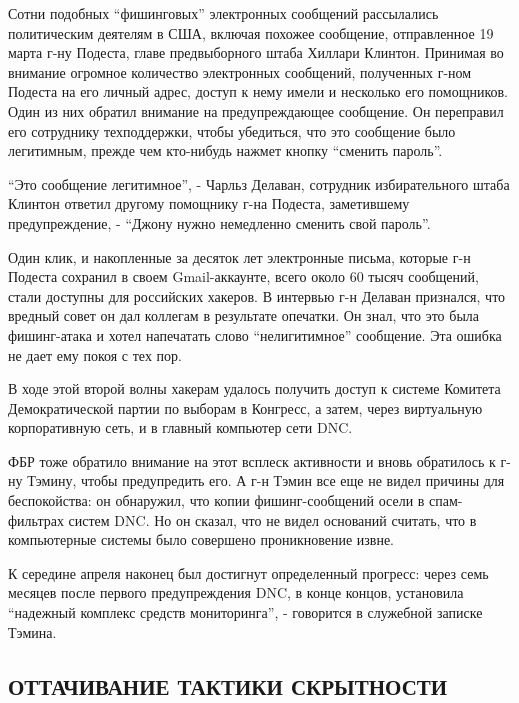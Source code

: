 Сотни подобных ``фишинговых'' электронных сообщений рассылались
политическим деятелям в США, включая похожее сообщение, отправленное 19
марта г-ну Подеста, главе предвыборного штаба Хиллари Клинтон. Принимая
во внимание огромное количество электронных сообщений, полученных г-ном
Подеста на его личный адрес, доступ к нему имели и несколько его
помощников. Один из них обратил внимание на предупреждающее сообщение.
Он переправил его сотруднику техподдержки, чтобы убедиться, что это
сообщение было легитимным, прежде чем кто-нибудь нажмет кнопку ``сменить
пароль''.

``Это сообщение легитимное'', - Чарльз Делаван, сотрудник избирательного
штаба Клинтон ответил другому помощнику г-на Подеста, заметившему
предупреждение, - ``Джону нужно немедленно сменить свой пароль''.

Один клик, и накопленные за десяток лет электронные письма, которые г-н
Подеста сохранил в своем Gmail-аккаунте, всего около 60 тысяч сообщений,
стали доступны для российских хакеров. В интервью г-н Делаван признался,
что вредный совет он дал коллегам в результате опечатки. Он знал, что
это была фишинг-атака и хотел напечатать слово ``нелигитимное''
сообщение. Эта ошибка не дает ему покоя с тех пор.

В ходе этой второй волны хакерам удалось получить доступ к системе
Комитета Демократической партии по выборам в Конгресс, а затем, через
виртуальную корпоративную сеть, и в главный компьютер сети DNC.

ФБР тоже обратило внимание на этот всплеск активности и вновь обратилось
к г-ну Тэмину, чтобы предупредить его. А г-н Тэмин все еще не видел
причины для беспокойства: он обнаружил, что копии фишинг-сообщений осели
в спам-фильтрах систем DNC. Но он сказал, что не видел оснований
считать, что в компьютерные системы было совершено проникновение извне.

К середине апреля наконец был достигнут определенный прогресс: через
семь месяцев после первого предупреждения DNC, в конце концов,
установила ``надежный комплекс средств мониторинга'', - говорится в
служебной записке Тэмина.

\hypertarget{ux43eux442ux442ux430ux447ux438ux432ux430ux43dux438ux435-ux442ux430ux43aux442ux438ux43aux438-ux441ux43aux440ux44bux442ux43dux43eux441ux442ux438}{%
\subsection{\texorpdfstring{\textbf{ОТТАЧИВАНИЕ ТАКТИКИ
СКРЫТНОСТИ}}{ОТТАЧИВАНИЕ ТАКТИКИ СКРЫТНОСТИ}}\label{ux43eux442ux442ux430ux447ux438ux432ux430ux43dux438ux435-ux442ux430ux43aux442ux438ux43aux438-ux441ux43aux440ux44bux442ux43dux43eux441ux442ux438}}

